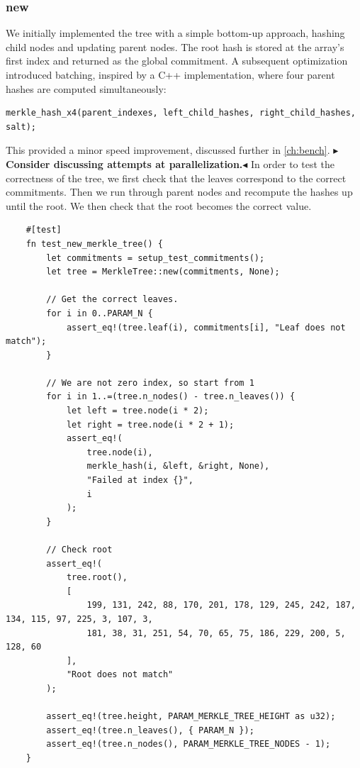 \documentclass[11pt]{report}
\theoremstyle{definition}
\theoremstyle{plain}
\newcommand{\todo}[1]{{\color[rgb]{.5,0,0}\textbf{$\blacktriangleright$#1$\blacktriangleleft$}}}
\begin{document}
\subsubsection{new}\label{sec:new}
We initially implemented the tree with a simple bottom-up approach, hashing child nodes and updating parent nodes. The root hash is stored at the array's first index and returned as the global commitment. A subsequent optimization introduced batching, inspired by a C++ implementation, where four parent hashes are computed simultaneously:
\begin{verbatim}
merkle_hash_x4(parent_indexes, left_child_hashes, right_child_hashes, salt);
\end{verbatim}
This provided a minor speed improvement, discussed further in \autoref{ch:bench}. \todo{Consider discussing attempts at parallelization.}
In order to test the correctness of the tree, we first check that the leaves correspond to the correct commitments. Then we run through parent nodes and recompute the hashes up until the root. We then check that the root becomes the correct value.
\begin{verbatim}
    #[test]
    fn test_new_merkle_tree() {
        let commitments = setup_test_commitments();
        let tree = MerkleTree::new(commitments, None);

        // Get the correct leaves.
        for i in 0..PARAM_N {
            assert_eq!(tree.leaf(i), commitments[i], "Leaf does not match");
        }

        // We are not zero index, so start from 1
        for i in 1..=(tree.n_nodes() - tree.n_leaves()) {
            let left = tree.node(i * 2);
            let right = tree.node(i * 2 + 1);
            assert_eq!(
                tree.node(i),
                merkle_hash(i, &left, &right, None),
                "Failed at index {}",
                i
            );
        }

        // Check root
        assert_eq!(
            tree.root(),
            [
                199, 131, 242, 88, 170, 201, 178, 129, 245, 242, 187, 134, 115, 97, 225, 3, 107, 3,
                181, 38, 31, 251, 54, 70, 65, 75, 186, 229, 200, 5, 128, 60
            ],
            "Root does not match"
        );

        assert_eq!(tree.height, PARAM_MERKLE_TREE_HEIGHT as u32);
        assert_eq!(tree.n_leaves(), { PARAM_N });
        assert_eq!(tree.n_nodes(), PARAM_MERKLE_TREE_NODES - 1);
    }
\end{verbatim}
\end{document}
